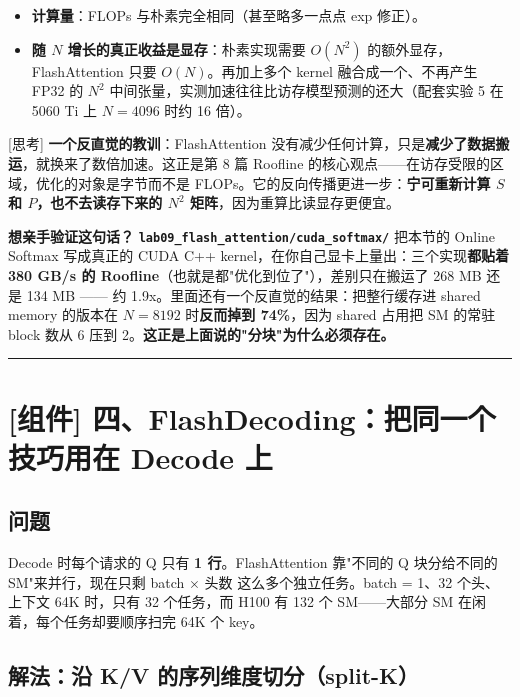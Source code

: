 \begin{itemize}
  \item \textbf{计算量}：FLOPs 与朴素完全相同（甚至略多一点点 exp 修正）。
  \item \textbf{随 $N$ 增长的真正收益是显存}：朴素实现需要 $O(N^2)$ 的额外显存，FlashAttention 只要 $O(N)$。再加上多个 kernel 融合成一个、不再产生 FP32 的 $N^2$ 中间张量，实测加速往往比访存模型预测的还大（配套实验 5 在 5060 Ti 上 $N = 4096$ 时约 16 倍）。
\end{itemize}

\begin{tipBox}[核心直觉与思考]
{}[思考] \textbf{一个反直觉的教训}：FlashAttention 没有减少任何计算，只是\textbf{减少了数据搬运}，就换来了数倍加速。这正是第 8 篇 Roofline 的核心观点——在访存受限的区域，优化的对象是字节而不是 FLOPs。它的反向传播更进一步：\textbf{宁可重新计算 $S$ 和 $P$，也不去读存下来的 $N^2$ 矩阵}，因为重算比读显存更便宜。
\end{tipBox}

\textbf{想亲手验证这句话？} \textbf{\texttt{lab09\_flash\_attention/cuda\_softmax/}} 把本节的 Online Softmax 写成真正的 CUDA C++ kernel，在你自己显卡上量出：三个实现\textbf{都贴着 380 GB/s 的 Roofline}（也就是都"优化到位了"），差别只在搬运了 268 MB 还是 134 MB —— 约 1.9x。里面还有一个反直觉的结果：把整行缓存进 shared memory 的版本在 $N = 8192$ 时\textbf{反而掉到 74\%}，因为 shared 占用把 SM 的常驻 block 数从 6 压到 2。\textbf{这正是上面说的"分块"为什么必须存在。}

\vspace{0.8em}\hrule\vspace{0.8em}

\section{[组件] 四、FlashDecoding：把同一个技巧用在 Decode 上}

\subsection{问题}

Decode 时每个请求的 Q 只有 \textbf{1 行}。FlashAttention 靠"不同的 Q 块分给不同的 SM"来并行，现在只剩 batch $\times$ 头数 这么多个独立任务。batch = 1、32 个头、上下文 64K 时，只有 32 个任务，而 H100 有 132 个 SM——大部分 SM 在闲着，每个任务却要顺序扫完 64K 个 key。

\subsection{解法：沿 K/V 的序列维度切分（split-K）}

